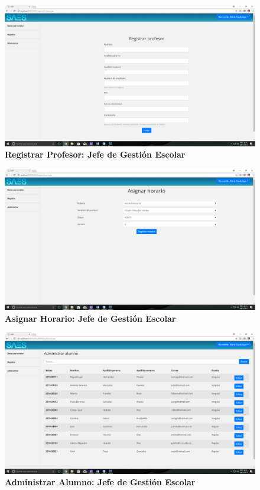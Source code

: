 \begin{figure}[H]
  \centering
    \includegraphics[scale=0.2]{project/images/18.png}
  \caption{\textbf{Registrar Profesor: Jefe de Gestión Escolar}}
\end{figure}
\begin{figure}[H]
  \centering
    \includegraphics[scale=0.2]{project/images/20.png}
  \caption{\textbf{Asignar Horario: Jefe de Gestión Escolar}}
\end{figure}
\begin{figure}[H]
  \centering
    \includegraphics[scale=0.2]{project/images/27.png}
  \caption{\textbf{Administrar Alumno: Jefe de Gestión Escolar}}
\end{figure}
